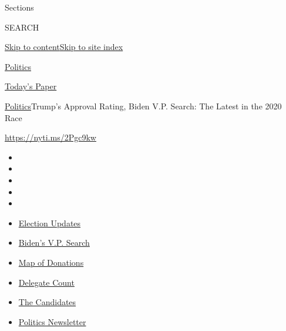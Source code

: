 Sections

SEARCH

\protect\hyperlink{site-content}{Skip to
content}\protect\hyperlink{site-index}{Skip to site index}

\href{https://www.nytimes.com/section/politics}{Politics}

\href{https://myaccount.nytimes.com/auth/login?response_type=cookie\&client_id=vi}{}

\href{https://www.nytimes.com/section/todayspaper}{Today's Paper}

\href{/section/politics}{Politics}\textbar{}Trump's Approval Rating,
Biden V.P. Search: The Latest in the 2020 Race

\url{https://nyti.ms/2Pgc9kw}

\begin{itemize}
\item
\item
\item
\item
\item
\end{itemize}

\begin{itemize}
\item
  \href{https://www.nytimes.com/2020/07/31/us/elections/biden-vs-trump.html?action=click\&pgtype=Article\&state=default\&region=TOP_BANNER\&context=storylines_menu}{Election
  Updates}
\item
  \href{https://www.nytimes.com/article/biden-vice-president-2020.html?action=click\&pgtype=Article\&state=default\&region=TOP_BANNER\&context=storylines_menu}{Biden's
  V.P. Search}
\item
  \href{https://www.nytimes.com/interactive/2020/07/24/us/politics/trump-biden-campaign-donors.html?action=click\&pgtype=Article\&state=default\&region=TOP_BANNER\&context=storylines_menu}{Map
  of Donations}
\item
  \href{https://www.nytimes.com/interactive/2020/us/elections/delegate-count-primary-results.html?action=click\&pgtype=Article\&state=default\&region=TOP_BANNER\&context=storylines_menu}{Delegate
  Count}
\item
  \href{https://www.nytimes.com/interactive/2019/us/politics/2020-presidential-candidates.html?action=click\&pgtype=Article\&state=default\&region=TOP_BANNER\&context=storylines_menu}{The
  Candidates}
\item
  \href{https://www.nytimes.com/newsletters/politics?action=click\&pgtype=Article\&state=default\&region=TOP_BANNER\&context=storylines_menu}{Politics
  Newsletter}
\end{itemize}

